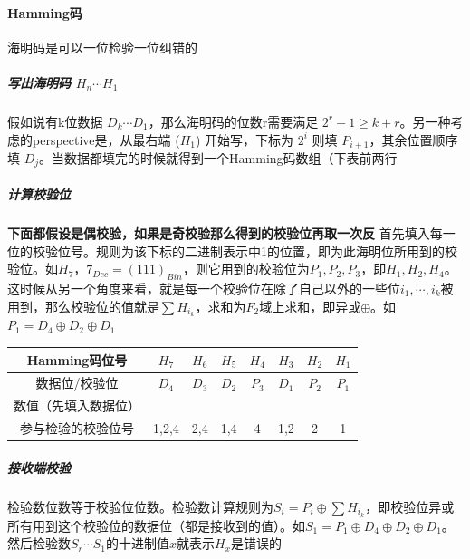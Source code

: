 \documentclass[]{report}
\begin{document}
		\paragraph{Hamming码} 海明码是可以一位检验一位纠错的
			\subparagraph{写出海明码 $H_n\cdots H_1$}
			假如说有k位数据 $D_k\cdots D_1$，那么海明码的位数r需要满足 $2^r-1\ge k+r$。另一种考虑的perspective是，从最右端 ($H_1$) 开始写，下标为 $2^i$ 则填 $P_{i+1}$，其余位置顺序填 $D_j$。当数据都填完的时候就得到一个Hamming码数组（下表前两行
			\subparagraph{计算校验位} \textbf{下面都假设是偶校验，如果是奇校验那么得到的校验位再取一次反}
			首先填入每一位的校验位号。规则为该下标的二进制表示中1的位置，即为此海明位所用到的校验位。如$H_7$，$7_{Dec}=(111)_{Bin}$，则它用到的校验位为$P_1,P_2,P_3$，即$H_1,H_2,H_4$。这时候从另一个角度来看，就是每一个校验位在除了自己以外的一些位$i_1,\cdots,i_k$被用到，那么校验位的值就是$\sum H_{i_k}$，求和为$F_2$域上求和，即异或$\oplus$。如$P_1=D_4\oplus D_2\oplus D_1$
			\begin{table}[h]
				\centering
				\begin{tabular}{c|*{7}{c}}
					\toprule
					Hamming码位号& $H_7$ & $H_6$ & $H_5$ & $H_4$ & $H_3$ & $H_2$ & $H_1$ \\
					\midrule
					数据位/校验位& $D_4$ & $D_3$ & $D_2$ & $P_3$ & $D_1$ & $P_2$ & $P_1$ \\
					数值（先填入数据位）&&&&&&&\\
					参与检验的校验位号& 1,2,4 & 2,4 & 1,4& 4 & 1,2 & 2 & 1 \\
					\bottomrule
				\end{tabular}
			\end{table}
			\subparagraph{接收端校验}
			检验数位数等于校验位位数。检验数计算规则为$S_i=P_i\oplus\sum H_{i_k}$，即校验位异或所有用到这个校验位的数据位（都是接收到的值）。如$S_1=P_1\oplus D_4\oplus D_2\oplus D_1$。然后检验数$S_r\cdots S_1$的十进制值$x$就表示$H_x$是错误的
\end{document}
